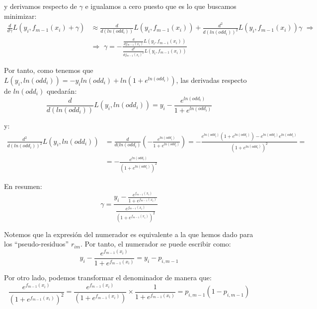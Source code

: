 \documentclass[12pt,twoside]{article}
\begin{document}
\noindent
y derivamos respecto de $\gamma$ e igualamos a cero puesto que es lo que buscamos minimizar:
\begin{equation*}
\begin{split}
\frac{d}{d\gamma}L(y_i, f_{m-1}(x_i) + \gamma) &\approx \frac{d}{d(ln(odd_i))}L(y_i, f_{m-1}(x_i)) + \frac{d^2}{d(ln(odd_i))^2}L(y_i, f_{m-1}(x_i))\gamma \, \, \Rightarrow \\
& \Rightarrow \, \, \gamma = - \frac{\frac{d}{df_{m-1}(x_i)}L(y_i, f_{m-1}(x_i))}{\frac{d^2}{df_{m-1}(x_i)^2}L(y_i, f_{m-1}(x_i))}
\end{split}
\end{equation*}

Por tanto, como tenemos que $L(y_i, ln(odd_i)) = -y_iln(odd_i) + ln(1 + e^{ln(odd_i)})$, las derivadas respecto de $ln(odd_i)$ quedarán:
\begin{equation*}
\frac{d}{d(ln(odd_i))}L(y_i, ln(odd_i)) = y_i - \frac{e^{ln(odd_i)}}{1 + e^{ln(odd_i)}}
\end{equation*}

\noindent
y:
\begin{equation*}
\begin{split}
\frac{d^2}{d(ln(odd_i))^2}L(y_i, ln(odd_i)) &=\frac{d}{d(ln(odd_i)} \left( - \frac{e^{ln(odd_i)}}{1 + e^{ln(odd_i)}} \right) = - \frac{e^{ln(odd_i)}(1 + e^{ln(odd_i)}) - e^{ln(odd_i)}e^{ln(odd_i)}}{(1 + e^{ln(odd_i)})^2} = \\
&= - \frac{e^{ln(odd_i)}}{(1 + e^{ln(odd_i)})^2}
\end{split}
\end{equation*}

En resumen:
\begin{equation*}
\gamma = \frac{y_i - \frac{e^{f_{m-1}(x_i)}}{1 + e^{f_{m-1}(x_i)}}}{\frac{e^{f_{m-1}(x_i)}}{(1 + e^{f_{m-1}(x_i)})^2}}
\end{equation*}

Notemos que la expresión del numerador es equivalente a la que hemos dado para los ``pseudo-residuos'' $r_{im}$. Por tanto, el numerador se puede escribir como:
\begin{equation*}
y_i - \frac{e^{f_{m-1}(x_i)}}{1 + e^{f_{m-1}(x_i)}} = y_i - p_{i, m-1}
\end{equation*}

Por otro lado, podemos transformar el denominador de manera que:
\begin{equation*}
\frac{e^{f_{m-1}(x_i)}}{(1 + e^{f_{m-1}(x_i)})^2} = \frac{e^{f_{m-1}(x_i)}}{(1 + e^{f_{m-1}(x_i)})} \times \frac{1}{1 + e^{f_{m-1}(x_i)}} = p_{i, m-1}(1 - p_{i, m-1})
\end{equation*}
\end{document}
